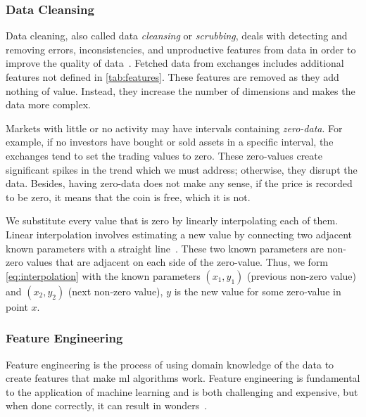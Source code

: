 \subsubsection{Data Cleansing}
Data cleaning, also called data \emph{cleansing} or \emph{scrubbing}, deals with detecting and removing errors, inconsistencies, and unproductive features from data in order to improve the quality of data~\cite{data_cleaning}. Fetched data from exchanges includes additional features not defined in \autoref{tab:features}. These features are removed as they add nothing of value. Instead, they increase the number of dimensions and makes the data more complex.

Markets with little or no activity may have intervals containing \emph{zero-data}. For example, if no investors have bought or sold assets in a specific interval, the exchanges tend to set the trading values to zero. These zero-values create significant spikes in the trend which we must address; otherwise, they disrupt the data. Besides, having zero-data does not make any sense, if the price is recorded to be zero, it means that the coin is free, which it is not.

We substitute every value that is zero by linearly interpolating each of them. Linear interpolation involves estimating a new value by connecting two adjacent known parameters with a straight line~\cite{interpolate}. These two known parameters are non-zero values that are adjacent on each side of the zero-value. Thus, we form \autoref{eq:interpolation} with the known parameters $(x_1, y_1)$ (previous non-zero value) and $(x_2, y_2)$ (next non-zero value), $y$ is the new value for some zero-value in point $x$.



\subsubsection{Feature Engineering}
Feature engineering is the process of using domain knowledge of the data to create features that make \ac{ml} algorithms work. Feature engineering is fundamental to the application of machine learning and is both challenging and expensive, but when done correctly, it can result in wonders~\cite{feature_engin}.


